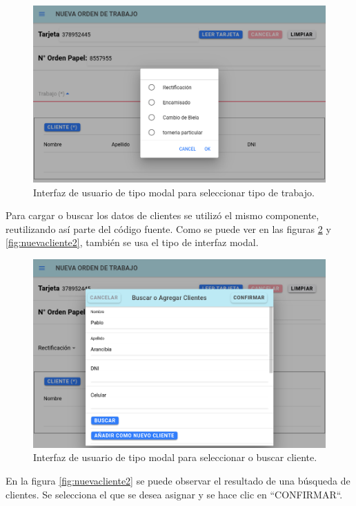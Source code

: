\begin{figure}[H]
	\centering
	\includegraphics[scale=.40]{./Figures/nueva-trabajo.png}
	\caption{Interfaz de usuario de tipo modal para seleccionar tipo de trabajo.}
	\label{fig:nuevatrabajo}
\end{figure}

Para cargar o buscar los datos de clientes se utilizó el mismo componente, reutilizando así parte del código fuente. Como se puede ver en las figuras \ref{fig:nuevacliente1} y \ref{fig:nuevacliente2}, también se usa el tipo de interfaz modal.

\begin{figure}[H]
	\centering
	\includegraphics[scale=.40]{./Figures/nueva-clientes-1.png}
	\caption{Interfaz de usuario de tipo modal para seleccionar o buscar cliente.}
	\label{fig:nuevacliente1}
\end{figure}

En la figura \ref{fig:nuevacliente2} se puede observar el resultado de una búsqueda de clientes. Se selecciona el que se desea asignar y se hace clic en ``CONFIRMAR``.

